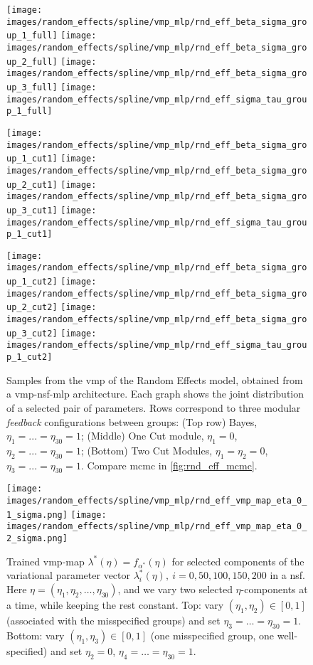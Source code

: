 \begin{figure}[!htb]
  \centering
  \texttt{[image: images/random\_effects/spline/vmp\_mlp/rnd\_eff\_beta\_sigma\_group\_1\_full]}
  \texttt{[image: images/random\_effects/spline/vmp\_mlp/rnd\_eff\_beta\_sigma\_group\_2\_full]}
  \texttt{[image: images/random\_effects/spline/vmp\_mlp/rnd\_eff\_beta\_sigma\_group\_3\_full]}
  \texttt{[image: images/random\_effects/spline/vmp\_mlp/rnd\_eff\_sigma\_tau\_group\_1\_full]}

  \texttt{[image: images/random\_effects/spline/vmp\_mlp/rnd\_eff\_beta\_sigma\_group\_1\_cut1]}
  \texttt{[image: images/random\_effects/spline/vmp\_mlp/rnd\_eff\_beta\_sigma\_group\_2\_cut1]}
  \texttt{[image: images/random\_effects/spline/vmp\_mlp/rnd\_eff\_beta\_sigma\_group\_3\_cut1]}
  \texttt{[image: images/random\_effects/spline/vmp\_mlp/rnd\_eff\_sigma\_tau\_group\_1\_cut1]}

  \texttt{[image: images/random\_effects/spline/vmp\_mlp/rnd\_eff\_beta\_sigma\_group\_1\_cut2]}
  \texttt{[image: images/random\_effects/spline/vmp\_mlp/rnd\_eff\_beta\_sigma\_group\_2\_cut2]}
  \texttt{[image: images/random\_effects/spline/vmp\_mlp/rnd\_eff\_beta\_sigma\_group\_3\_cut2]}
  \texttt{[image: images/random\_effects/spline/vmp\_mlp/rnd\_eff\_sigma\_tau\_group\_1\_cut2]}

  \caption[Random Effects model VMP]{
    Samples from the \acrlong*{vmp} of the Random Effects model, obtained from a \acrshort*{vmp}-\acrshort*{nsf}-\acrshort*{mlp} architecture. Each graph shows the joint distribution of a selected pair of parameters. Rows correspond to three modular \emph{feedback} configurations between groups: (Top row) Bayes, $\eta_1=...=\eta_{30}=1$; (Middle) One Cut module, $\eta_1=0$, $\eta_2=...=\eta_{30}=1$; (Bottom) Two Cut Modules, $\eta_1=\eta_2=0$, $\eta_3=...=\eta_{30}=1$.
    Compare \acrshort*{mcmc} in \cref{fig:rnd_eff_mcmc}.
  }
  \label{fig:rnd_eff_vmp}
\end{figure}

\begin{figure}[!htb]
  \centering
  \texttt{[image: images/random\_effects/spline/vmp\_mlp/rnd\_eff\_vmp\_map\_eta\_0\_1\_sigma.png]}
  \texttt{[image: images/random\_effects/spline/vmp\_mlp/rnd\_eff\_vmp\_map\_eta\_0\_2\_sigma.png]}

  \caption[Random Effects model VMP map]{
  Trained \acrshort*{vmp}-map $\lambda^*(\eta)=f_{\alpha^*}(\eta)$ for selected components of the variational parameter vector $\lambda^*_i(\eta),\ i=0,50,100,150,200$ in a \acrlong*{nsf}.
  Here $\eta = (\eta_{1},\eta_{2},\ldots,\eta_{30})$, and we vary two selected $\eta$-components at a time, while keeping the rest constant.
  Top: vary $(\eta_1,\eta_2)\in[0,1]$ (associated with the misspecified groups) and set $\eta_3=\ldots=\eta_{30}=1$.
  Bottom: vary $(\eta_1,\eta_3)\in[0,1]$ (one misspecified group, one well-specified) and set $\eta_2=0$, $\eta_4=\ldots=\eta_{30}=1$.
  }
  \label{fig:rnd_eff_vmp_map}
\end{figure}

